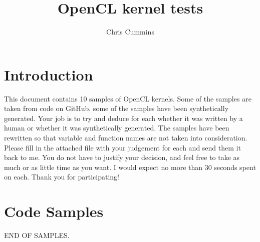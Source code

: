 \documentclass{article}
\begin{document}
  \title{OpenCL kernel tests}
  \author{Chris Cummins}

  \maketitle

  \section{Introduction}

  This document contains 10 samples of OpenCL kernels. Some of the samples are
  taken from code on GitHub, some of the samples have been synthetically
  generated. Your job is to try and deduce for each whether it was written by a
  human or whether it was synthetically generated. The samples have been rewritten
  so that variable and function names are not taken into consideration. Please
  fill in the attached file \texttt{}with your judgement for each and
  send them it back to me. You do not have to justify your decision, and feel free
  to take as much or as little time as you want. I would expect no more than 30
  seconds spent on each. Thank you for participating!

  \section{Code Samples}

  \lstset{language=[OpenCL]C}
  
  
  
  
  
  
  
  
  
  

  \noindent END OF SAMPLES.
\end{document}
